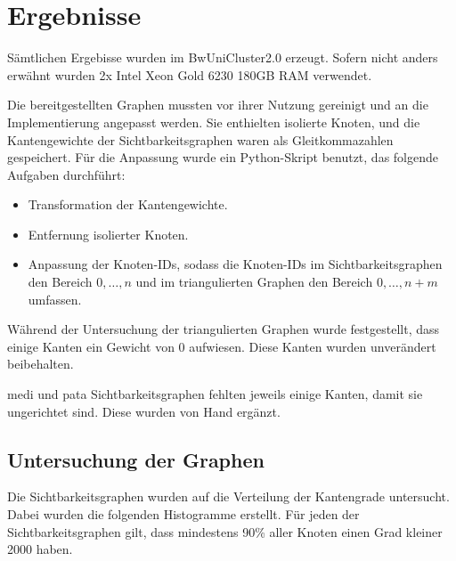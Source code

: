 \chapter{Ergebnisse}

Sämtlichen Ergebisse wurden im BwUniCluster2.0 erzeugt. Sofern nicht anders erwähnt wurden
2x Intel Xeon Gold 6230
180GB RAM verwendet.

Die bereitgestellten Graphen mussten vor ihrer Nutzung gereinigt und an die Implementierung angepasst werden.
Sie enthielten isolierte Knoten, und die Kantengewichte der Sichtbarkeitsgraphen waren als Gleitkommazahlen gespeichert.
Für die Anpassung wurde ein Python-Skript benutzt, das folgende Aufgaben durchführt:

\begin{itemize}
    \item
          Transformation der Kantengewichte.

    \item
          Entfernung isolierter Knoten.

    \item
          Anpassung der Knoten-IDs, sodass die Knoten-IDs im Sichtbarkeitsgraphen den Bereich $0, \dotsc, n$ und im triangulierten Graphen den Bereich $0, \dotsc, n + m$ umfassen.
\end{itemize}

Während der Untersuchung der triangulierten Graphen wurde festgestellt, dass einige Kanten ein Gewicht von 0 aufwiesen.
Diese Kanten wurden unverändert beibehalten.

medi und pata Sichtbarkeitsgraphen fehlten jeweils einige Kanten, damit sie ungerichtet sind.
Diese wurden von Hand ergänzt.

\section{Untersuchung der Graphen}

Die Sichtbarkeitsgraphen wurden auf die Verteilung der Kantengrade untersucht.
Dabei wurden die folgenden Histogramme erstellt.
Für jeden der Sichtbarkeitsgraphen gilt, dass mindestens 90\% aller Knoten einen Grad kleiner \num{2000} haben.

